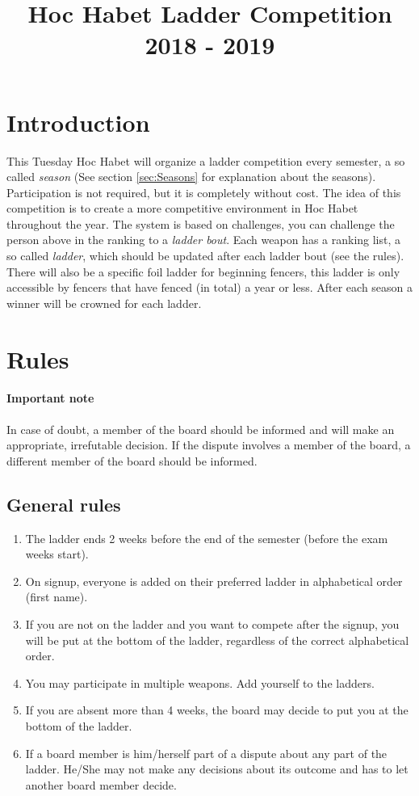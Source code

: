 \documentclass{article}
\title{Hoc Habet Ladder Competition \\ 2018 - 2019}
\author{}
\date{}
\begin{document}
\maketitle
\section{Introduction}
This Tuesday Hoc Habet will organize a ladder competition every semester, a so called \emph{season} (See section \ref{sec:Seasons} for explanation about the seasons). Participation is not required, but it is completely without cost. The idea of this competition is to create a more competitive environment in Hoc Habet throughout the year. The system is based on challenges, you can challenge the person above in the ranking to a \emph{ladder bout}. Each weapon has a ranking list, a so called \emph{ladder}, which should be updated after each ladder bout (see the rules). There will also be a specific foil ladder for beginning fencers, this ladder is only accessible by fencers that have fenced (in total) a year or less. After each season a winner will be crowned for each ladder.

\section{Rules}
\paragraph{Important note} In case of doubt, a member of the board should be informed and will make an appropriate, irrefutable decision. If the dispute involves a member of the board, a different member of the board should be informed.
\subsection{General rules}
\begin{enumerate}
    \item The ladder ends 2 weeks before the end of the semester (before the exam weeks start).
    \item On signup, everyone is added on their preferred ladder in alphabetical order (first name). 
    \item If you are not on the ladder and you want to compete after the signup, you will be put at the bottom of the ladder, regardless of the correct alphabetical order.
    \item You may participate in multiple weapons. Add yourself to the ladders.
    \item If you are absent more than 4 weeks, the board may decide to put you at the bottom of the ladder.
    \item If a board member is him/herself part of a dispute about any part of the ladder. He/She may not make any decisions about its outcome and has to let another board member decide.
\end{enumerate}
\end{document}
